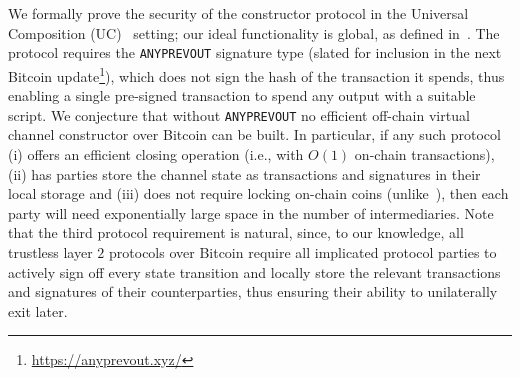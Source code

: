   We formally prove the security of the constructor protocol in the Universal
  Composition (UC)~\cite{uc} setting; our ideal functionality is global,
  as defined in~\cite{DBLP:conf/tcc/BadertscherCHTZ20}. The
  protocol requires the \texttt{ANYPREVOUT} signature type (slated for
  inclusion in the next Bitcoin update\footnote{\url{https://anyprevout.xyz/}}), which does not sign the hash of the
  transaction it spends, thus enabling a single pre-signed transaction
  to spend any output with a suitable script. We conjecture that without
  \texttt{ANYPREVOUT} no efficient off-chain virtual channel constructor
  over Bitcoin can be built. In particular, if any such protocol
  (i) offers an efficient closing operation (i.e., with $O(1)$ on-chain
  transactions), (ii) has parties store the channel state as transactions and
  signatures in their local storage and (iii) does not require locking on-chain
  coins (unlike~\cite{donner}), then each party will need exponentially
  large space in the number of intermediaries. Note that the third protocol
  requirement is natural, since, to our knowledge, all trustless layer $2$
  protocols over Bitcoin require all implicated protocol parties to actively
  sign off every state transition and locally store the relevant transactions
  and signatures of their counterparties, thus ensuring their ability to
  unilaterally exit later.
